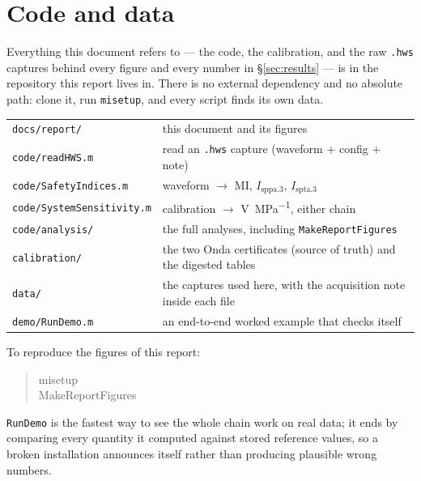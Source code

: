 \documentclass[11pt,a4paper]{article}
\begin{document}
\section{Code and data}\label{sec:files}
Everything this document refers to --- the code, the calibration, and the raw \texttt{.hws} captures
behind every figure and every number in \S\ref{sec:results} --- is in the repository this report
lives in. There is no external dependency and no absolute path: clone it, run \texttt{misetup}, and
every script finds its own data.

\begin{center}
\begin{tabular}{ll}
\toprule
\texttt{docs/report/}          & this document and its figures \\
\texttt{code/readHWS.m}        & read an \texttt{.hws} capture (waveform $+$ config $+$ note) \\
\texttt{code/SafetyIndices.m}  & waveform $\rightarrow$ MI, $I_\mathrm{sppa.3}$, $I_\mathrm{spta.3}$ \\
\texttt{code/SystemSensitivity.m} & calibration $\rightarrow$ \si{\volt\per\mega\pascal}, either chain \\
\texttt{code/analysis/}        & the full analyses, including \texttt{MakeReportFigures} \\
\texttt{calibration/}          & the two Onda certificates (source of truth) and the digested tables \\
\texttt{data/}                 & the captures used here, with the acquisition note inside each file \\
\texttt{demo/RunDemo.m}        & an end-to-end worked example that checks itself \\
\bottomrule
\end{tabular}
\end{center}

\noindent To reproduce the figures of this report:

\begin{quote}\ttfamily
misetup \\
MakeReportFigures
\end{quote}

\noindent
\texttt{RunDemo} is the fastest way to see the whole chain work on real data; it ends by comparing
every quantity it computed against stored reference values, so a broken installation announces
itself rather than producing plausible wrong numbers.


\appendix

\end{document}
